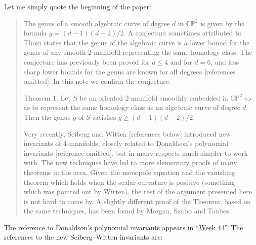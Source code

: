 \documentclass[12pt]{article}
\renewcommand{\texttt}[1]{%
  \begingroup
  \ttfamily
  \begingroup\lccode`~=`/\lowercase{\endgroup\def~}{/\discretionary{}{}{}}%
  \begingroup\lccode`~=`[\lowercase{\endgroup\def~}{[\discretionary{}{}{}}%
  \begingroup\lccode`~=`.\lowercase{\endgroup\def~}{.\discretionary{}{}{}}%
  \catcode`/=\active\catcode`[=\active\catcode`.=\active
  \scantokens{#1\noexpand}%
  \endgroup
}
\begin{document}
Let me simply quote the beginning of the paper:

\begin{quote}
The genus of a smooth algebraic curve of degree \(d\) in
\(\mathbb{CP}^2\) is given by the formula \(g = (d-1)(d-2)/2\). A
conjecture sometimes attributed to Thom states that the genus of the
algebraic curve is a lower bound for the genus of any smooth 2-manifold
representing the same homology class. The conjecture has previously been
proved for \(d \leqslant 4\) and for \(d = 6\), and less sharp lower
bounds for the genus are known for all degrees {[}references omitted{]}.
In this note we confirm the conjecture.

Theorem 1. Let \(S\) be an oriented 2-manifold smoothly embedded in
\(\mathbb{CP}^2\) so as to represent the same homology class as an
algebraic curve of degree \(d\). Then the genus \(g\) of \(S\) satisfies
\(g \geqslant (d-1)(d-2)/2\).

Very recently, Seiberg and Witten {[}references below{]} introduced new
invariants of 4-manifolds, closely related to Donaldson's polynomial
invariants {[}reference omitted{]}, but in many respects much simpler to
work with. The new techniques have led to more elementary proofs of many
theorems in the area. Given the monopole equation and the vanishing
theorem which holds when the scalar curvature is positive (something
which was pointed out by Witten), the rest of the argument presented
here is not hard to come by. A slightly different proof of the Theorem,
based on the same techniques, has been found by Morgan, Szabo and
Taubes.
\end{quote}

\noindent
The reference to Donaldson's polynomial invariants appears in
\protect\hyperlink{week44}{``Week 44''}. The references to the new
Seiberg--Witten invariants are:

\end{document}
